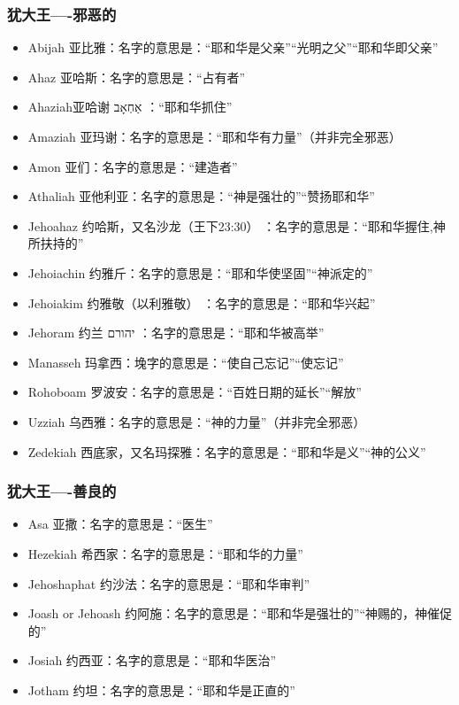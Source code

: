 \subsubsection{犹大王----邪恶的}
\begin{itemize}
\itemsep-.45em

\item Abijah  亚比雅：名字的意思是：“耶和华是父亲”“光明之父”“耶和华即父亲”
\item Ahaz  亚哈斯：名字的意思是：“占有者”
\item Ahaziah亚哈谢 אַחְאָב ：“耶和华抓住”
\item Amaziah  亚玛谢：名字的意思是：“耶和华有力量”（并非完全邪恶）
\item Amon  亚们：名字的意思是：“建造者”
\item Athaliah  亚他利亚：名字的意思是：“神是强壮的”“赞扬耶和华”
\item Jehoahaz 约哈斯，又名沙龙（王下23:30）  ：名字的意思是：“耶和华握住,神所扶持的”
\item Jehoiachin  约雅斤：名字的意思是：“耶和华使坚固”“神派定的”
\item Jehoiakim  约雅敬（以利雅敬）  ：名字的意思是：“耶和华兴起”
\item Jehoram 约兰  יהורם ：名字的意思是：“耶和华被高举”
\item Manasseh  玛拿西：堍字的意思是：“使自己忘记”“使忘记”
\item Rohoboam  罗波安：名字的意思是：“百姓日期的延长”“解放”
\item Uzziah  乌西雅：名字的意思是：“神的力量”（并非完全邪恶）
\item Zedekiah  西底家，又名玛探雅：名字的意思是：“耶和华是义”“神的公义”
\end{itemize}

\subsubsection{犹大王----善良的}
\begin{itemize}
\itemsep-.45em
\item Asa  亚撒：名字的意思是：“医生”
\item Hezekiah  希西家：名字的意思是：“耶和华的力量”
\item Jehoshaphat  约沙法：名字的意思是：“耶和华审判”
\item Joash or Jehoash  约阿施：名字的意思是：“耶和华是强壮的”“神赐的，神催促的”
\item Josiah  约西亚：名字的意思是：“耶和华医治”
\item Jotham  约坦：名字的意思是：“耶和华是正直的”
\end{itemize}

